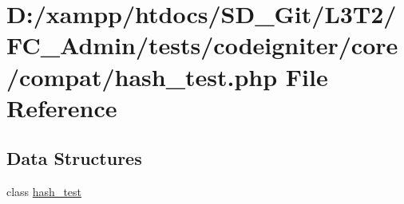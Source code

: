 \hypertarget{_admin_2tests_2codeigniter_2core_2compat_2hash__test_8php}{}\section{D\+:/xampp/htdocs/\+S\+D\+\_\+\+Git/\+L3\+T2/\+F\+C\+\_\+\+Admin/tests/codeigniter/core/compat/hash\+\_\+test.php File Reference}
\label{_admin_2tests_2codeigniter_2core_2compat_2hash__test_8php}
\subsection*{Data Structures}
\begin{DoxyCompactItemize}
\item 
class \hyperlink{classhash__test}{hash\+\_\+test}
\end{DoxyCompactItemize}
